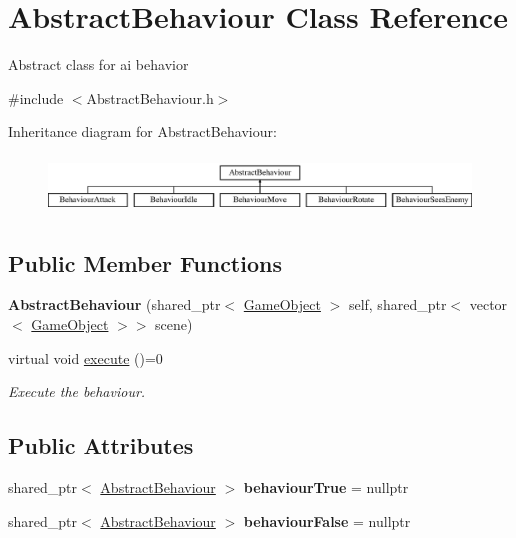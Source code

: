 \hypertarget{class_abstract_behaviour}{}\section{Abstract\+Behaviour Class Reference}
\label{class_abstract_behaviour}


Abstract class for ai behavior  




{\ttfamily \#include $<$Abstract\+Behaviour.\+h$>$}

Inheritance diagram for Abstract\+Behaviour\+:\begin{figure}[H]
\begin{center}
\leavevmode
\includegraphics[height=1.555556cm]{class_abstract_behaviour}
\end{center}
\end{figure}
\subsection*{Public Member Functions}
\begin{DoxyCompactItemize}
\item 
\mbox{\label{class_abstract_behaviour_a8a3a9217b3179f949a1d6a32f340c00c}} 
{\bfseries Abstract\+Behaviour} (shared\+\_\+ptr$<$ \mbox{\hyperlink{class_game_object}{Game\+Object}} $>$ self, shared\+\_\+ptr$<$ vector$<$ \mbox{\hyperlink{class_game_object}{Game\+Object}} $>$$>$ scene)
\item 
virtual void \mbox{\hyperlink{class_abstract_behaviour_ab99fb55a3b001e759e24d5b9721a742f}{execute}} ()=0
\begin{DoxyCompactList}\small\item\em Execute the behaviour. \end{DoxyCompactList}\end{DoxyCompactItemize}
\subsection*{Public Attributes}
\begin{DoxyCompactItemize}
\item 
\mbox{\label{class_abstract_behaviour_a31b24fd948394c975ef56593e4ac0b28}} 
shared\+\_\+ptr$<$ \mbox{\hyperlink{class_abstract_behaviour}{Abstract\+Behaviour}} $>$ {\bfseries behaviour\+True} = nullptr
\item 
\mbox{\label{class_abstract_behaviour_ad8e09f7cb5f6341b16f20845c8d3dd59}} 
shared\+\_\+ptr$<$ \mbox{\hyperlink{class_abstract_behaviour}{Abstract\+Behaviour}} $>$ {\bfseries behaviour\+False} = nullptr
\end{DoxyCompactItemize}
